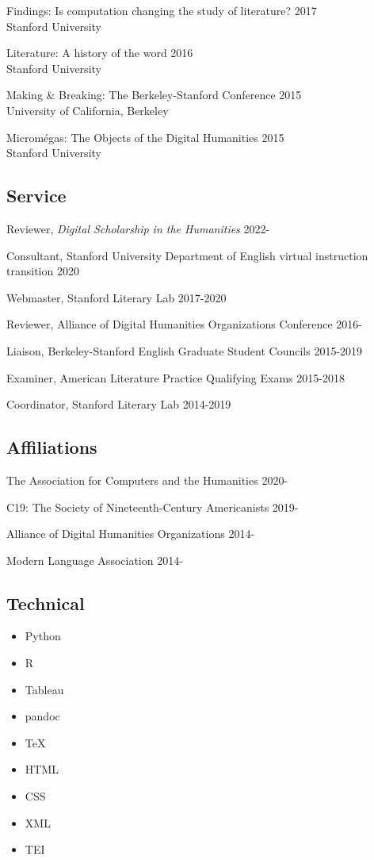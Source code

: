 \documentclass[
  12pt,
  letterpaper,
]{article}
\providecommand{\tightlist}{%
  \setlength{\itemsep}{0pt}\setlength{\parskip}{0pt}}
\begin{document}
Findings: Is computation changing the study of literature? \hfill 2017\\
\hspace*{0.333em} Stanford University

Literature: A history of the word \hfill 2016\\
\hspace*{0.333em} Stanford University

Making \& Breaking: The Berkeley-Stanford Conference \hfill 2015\\
\hspace*{0.333em} University of California, Berkeley

Micromégas: The Objects of the Digital Humanities \hfill 2015\\
\hspace*{0.333em} Stanford University

\hypertarget{service}{%
\subsection{Service}\label{service}}

Reviewer, \emph{Digital Scholarship in the Humanities} \hfill 2022-

Consultant, Stanford University Department of English virtual
instruction transition \hfill 2020

Webmaster, Stanford Literary Lab \hfill 2017-2020

Reviewer, Alliance of Digital Humanities Organizations Conference
\hfill 2016-

Liaison, Berkeley-Stanford English Graduate Student Councils
\hfill 2015-2019

Examiner, American Literature Practice Qualifying Exams \hfill 2015-2018

Coordinator, Stanford Literary Lab \hfill 2014-2019

\hypertarget{affiliations}{%
\subsection{Affiliations}\label{affiliations}}

The Association for Computers and the Humanities \hfill 2020-

C19: The Society of Nineteenth-Century Americanists \hfill 2019-

Alliance of Digital Humanities Organizations \hfill 2014-

Modern Language Association \hfill 2014-

\hypertarget{technical}{%
\subsection{Technical}\label{technical}}

\begin{itemize}
\tightlist
\item
  Python
\item
  R
\item
  Tableau
\item
  pandoc
\item
  TeX
\item
  HTML
\item
  CSS
\item
  XML
\item
  TEI
\end{itemize}
\end{document}
